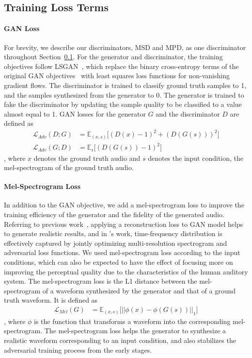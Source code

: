 \subsection{Training Loss Terms}
\label{training_loss_terms}
\paragraph{GAN Loss} For brevity, we describe our discriminators, MSD and MPD, as one discriminator throughout Section~\ref{training_loss_terms}. For the generator and discriminator, the training objectives follow LSGAN~\citep{mao2017least}, which replace the binary cross-entropy terms of the original GAN objectives~\citep{goodfellow2014generative} with least squares loss functions for non-vanishing gradient flows. The discriminator is trained to classify ground truth samples to 1, and the samples synthesized from the generator to 0. The generator is trained to fake the discriminator by updating the sample quality to be classified to a value almost equal to 1. GAN losses for the generator $G$ and the discriminator $D$ are defined as
\begin{align}
    \mathcal{L}_{Adv}(D; G) &= \mathbb{E}_{(x, s)} \Bigg[(D(x)-1)^2 + (D(G(s)))^2\Bigg]\\
    \mathcal{L}_{Adv}(G; D) &= \mathbb{E}_{s} \Bigg[(D(G(s))-1)^2\Bigg]
\end{align}
, where $x$ denotes the ground truth audio and $s$ denotes the input condition, the mel-spectrogram of the ground truth audio.

\paragraph{Mel-Spectrogram Loss} 
In addition to the GAN objective, we add a mel-spectrogram loss to improve the training efficiency of the generator and the fidelity of the generated audio.
Referring to previous work~\citep{isola2017image}, applying a reconstruction loss to GAN model helps to generate realistic results, and in \citet{yamamoto2020parallel}'s work, time-frequency distribution is effectively captured by jointly optimizing multi-resolution spectrogram and adversarial loss functions. 
We used mel-spectrogram loss according to the input conditions, 
which can also be expected to have the effect of focusing more on improving the perceptual quality due to the characteristics of the human auditory system.
The mel-spectrogram loss is the L1 distance between the mel-spectrogram of a waveform synthesized by the generator and that of a ground truth waveform. It is defined as
\begin{align}
    \mathcal{L}_{Mel}(G) &= \mathbb{E}_{(x, s)} \Bigg[||\phi(x)-\phi(G(s))||_{1}\Bigg]
\end{align}
, where $\phi$ is the function that transforms a waveform into the corresponding mel-spectrogram. The mel-spectrogram loss helps the generator to synthesize a realistic waveform corresponding to an input condition, and also stabilizes the adversarial training process from the early stages.


